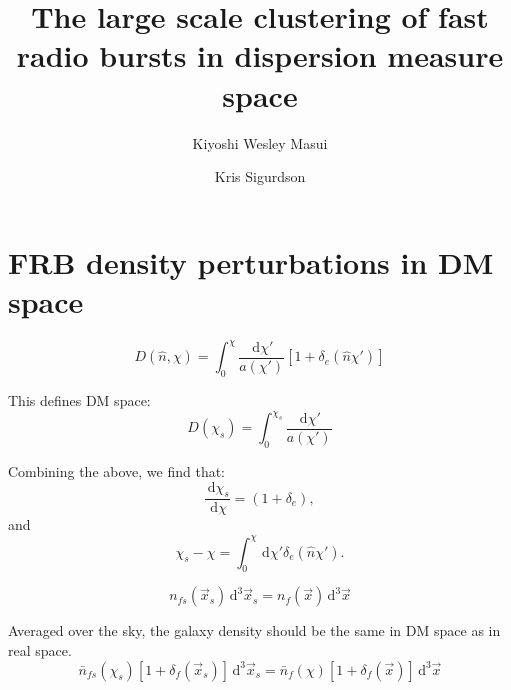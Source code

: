 \documentclass[onecolumn,prd,nofootinbib]{revtex4-1}
\newcommand{\ud}{\,\mathrm{d}}
\begin{document}
\title{The large scale clustering of fast radio bursts in dispersion measure space}

\author{Kiyoshi Wesley Masui}

\author{Kris Sigurdson}


\begin{abstract}

\end{abstract}

\maketitle

\section{FRB density perturbations in DM space}

\begin{equation}
D(\hat n, \chi) = \int_0^\chi \frac{\ud\chi'}{a(\chi')}
   \left[1 + \delta_e(\hat{n}\chi')\right]
\end{equation}

This defines DM space:
\begin{equation}
D(\chi_s) = \int_0^{\chi_s}\frac{\ud\chi'}{a(\chi')}
\end{equation}

Combining the above, we find that:
\begin{equation}
\frac{\ud \chi_s}{\ud \chi} = (1 + \delta_e),
\end{equation}
and
\begin{equation}
\chi_s - \chi = \int_0^\chi \ud \chi' \delta_e(\hat n \chi').
\end{equation}

\begin{equation}
\label{e:density}
n_{fs}(\vec x_s) \ud^3\vec x_s = n_{f}(\vec x) \ud^3\vec x
\end{equation}

Averaged over the sky, the galaxy density should be the same in DM 
space as in real space.
\begin{equation}
\bar{n}_{fs}(\chi_s)\left[ 1 + \delta_f(\vec x_s)\right] \ud^3\vec x_s
    = \bar{n}_{f}(\chi)\left[ 1 + \delta_f(\vec x)\right] \ud^3\vec x
\end{equation}
\end{document}
